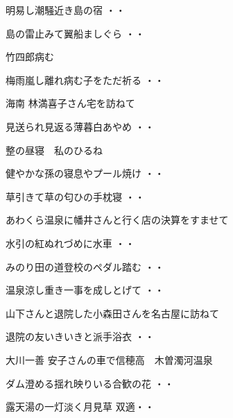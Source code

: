 \begin{shiika}明易し潮騒近き島の宿
\hfill{・・}\end{shiika}
\vspace{0.6cm}
\begin{shiika}島の雷止みて翼船ましぐら
\hfill{・・}\end{shiika}
\vspace{0.6cm}
竹四郎病む
\begin{shiika}梅雨嵐し離れ病む子をただ祈る
\hfill{・・}\end{shiika}
\vspace{0.6cm}
海南 林満喜子さん宅を訪ねて
\begin{shiika}見送られ見返る薄暮白あやめ
\hfill{・・}\end{shiika}
\vspace{0.6cm}
整の昼寝　私のひるね
\begin{shiika}健やかな孫の寝息やプール焼け
\hfill{・・}\end{shiika}
\begin{shiika}草引きて草の匂ひの手枕寝
\hfill{・・}\end{shiika}
\vspace{0.6cm}
あわくら温泉に幡井さんと行く店の決算をすませて
\begin{shiika}水引の紅ぬれづめに水車
\hfill{・・}\end{shiika}
\begin{shiika}みのり田の道登校のペダル踏む
\hfill{・・}\end{shiika}
\begin{shiika}温泉涼し重き一事を成しとげて
\hfill{・・}\end{shiika}
\vspace{0.6cm}
山下さんと退院した小森田さんを名古屋に訪ねて
\begin{shiika}退院の友いきいきと派手浴衣
\hfill{・・}\end{shiika}
\vspace{0.6cm}
大川一善 安子さんの車で信穂高　木曽濁河温泉
\begin{shiika}ダム澄める揺れ映りいる合歓の花
\hfill{・・}\end{shiika}
\begin{shiika}露天湯の一灯淡く月見草
\hfill{双適・・}\end{shiika}
